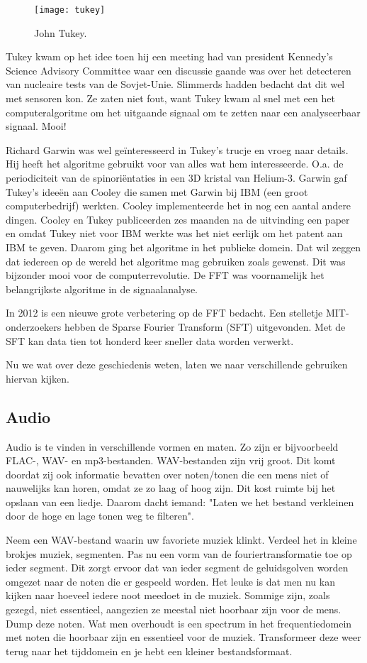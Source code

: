 \documentclass[11pt,fleqn]{book} %
\begin{document}
\begin{figure}[h]
	\centering\texttt{[image: tukey]}
	\caption{John Tukey.}
	\label{fig:tukey}
\end{figure}

Tukey kwam op het idee toen hij een meeting had van president Kennedy’s Science Advisory Committee waar een discussie gaande was over het detecteren van nucleaire tests van de Sovjet-Unie. Slimmerds hadden bedacht dat dit wel met sensoren kon. Ze zaten niet fout, want Tukey kwam al snel met een het computeralgoritme om het uitgaande signaal om te zetten naar een analyseerbaar signaal. Mooi!

Richard Garwin was wel geïnteresseerd in Tukey’s trucje en vroeg naar details. Hij heeft het algoritme gebruikt voor van alles wat hem interesseerde. O.a. de periodiciteit van de spinoriëntaties in een 3D kristal van Helium-3. Garwin gaf Tukey’s ideeën aan Cooley die samen met Garwin bij IBM (een groot computerbedrijf) werkten. Cooley implementeerde het in nog een aantal andere dingen. Cooley en Tukey publiceerden zes maanden na de uitvinding een paper en omdat Tukey niet voor IBM werkte was het niet eerlijk om het patent aan IBM te geven. Daarom ging het algoritme in het publieke domein. Dat wil zeggen dat iedereen op de wereld het algoritme mag gebruiken zoals gewenst. Dit was bijzonder mooi voor de computerrevolutie. De FFT was voornamelijk het belangrijkste algoritme in de signaalanalyse.

In 2012 is een nieuwe grote verbetering op de FFT bedacht. Een stelletje MIT-onderzoekers hebben de Sparse Fourier Transform (SFT) uitgevonden. Met de SFT kan data tien tot honderd keer sneller data worden verwerkt.

Nu we wat over deze geschiedenis weten, laten we naar verschillende gebruiken hiervan kijken.

\subsection{Audio}
Audio is te vinden in verschillende vormen en maten. Zo zijn er bijvoorbeeld FLAC-, WAV- en mp3-bestanden. WAV-bestanden zijn vrij groot. Dit komt doordat zij ook informatie bevatten over noten/tonen die een mens niet of nauwelijks kan horen, omdat ze zo laag of hoog zijn. Dit kost ruimte bij het opslaan van een liedje. Daarom dacht iemand: "Laten we het bestand verkleinen door de hoge en lage tonen weg te filteren".

Neem een WAV-bestand waarin uw favoriete muziek klinkt. Verdeel het in kleine brokjes muziek, segmenten. Pas nu een vorm van de fouriertransformatie toe op ieder segment. Dit zorgt ervoor dat van ieder segment de geluidsgolven worden omgezet naar de noten die er gespeeld worden. Het leuke is dat men nu kan kijken naar hoeveel iedere noot meedoet in de muziek. Sommige zijn, zoals gezegd, niet essentieel, aangezien ze meestal niet hoorbaar zijn voor de mens. Dump deze noten. Wat men overhoudt is een spectrum in het frequentiedomein met noten die hoorbaar zijn en essentieel voor de muziek. Transformeer deze weer terug naar het tijddomein en je hebt een kleiner bestandsformaat.
\end{document}
